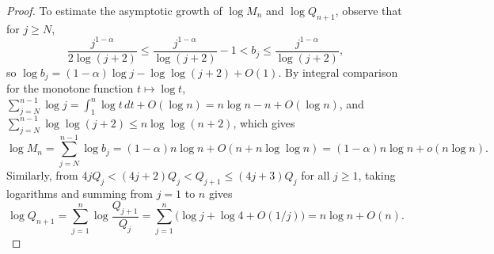 \documentclass[11pt]{article}
\theoremstyle{definition}
\theoremstyle{remark}
\begin{document}
\begin{proof}
To estimate the asymptotic growth of $\log M_n$ and $\log Q_{n+1}$, observe
that for $j\ge N$,
\[
\frac{j^{1-\alpha}}{2\log(j+2)}\le\frac{j^{1-\alpha}}{\log(j+2)}-1
<b_j\le\frac{j^{1-\alpha}}{\log(j+2)},
\]
so $\log b_j=(1-\alpha)\log j-\log\log(j+2)+O(1)$. By integral comparison for
the monotone function $t\mapsto\log t$,
$\sum_{j=N}^{n-1}\log j=\int_1^n\log t\,dt+O(\log n)=n\log n-n+O(\log n)$, and
$\sum_{j=N}^{n-1}\log\log(j+2)\le n\log\log(n+2)$, which gives
\begin{equation}\label{eq:log-Mn-asymp}
\log M_n=\sum_{j=N}^{n-1}\log b_j
=(1-\alpha)n\log n+O(n+n\log\log n)=(1-\alpha)n\log n+o(n\log n).
\end{equation}
Similarly, from $4jQ_j<(4j+2)Q_j<Q_{j+1}\le(4j+3)Q_j$ for all $j\ge1$, taking
logarithms and summing from $j=1$ to $n$ gives
\[
\log Q_{n+1}=\sum_{j=1}^n\log\frac{Q_{j+1}}{Q_j}
=\sum_{j=1}^n\bigl(\log j+\log 4+O(1/j)\bigr)=n\log n+O(n).
\]


\end{proof}
\end{document}
